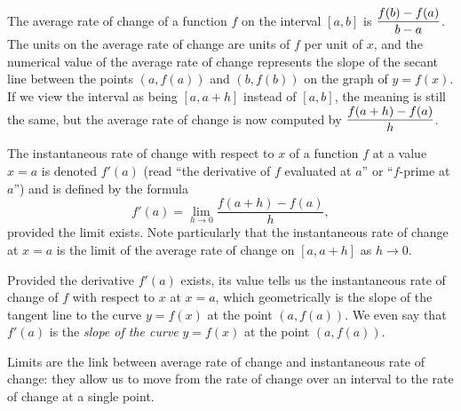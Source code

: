\begin{summary}
\item The average rate of change of a function $f$ on the interval $[a,b]$ is $\displaystyle \frac{f(b)-f(a)}{b-a}$.  The units on the average rate of change are units of $f$ per unit of $x$, and the numerical value of the average rate of change represents the slope of the secant line between the points $(a,f(a))$ and $(b,f(b))$ on the graph of $y = f(x)$.  If we view the interval as being $[a,a+h]$ instead of $[a,b]$, the meaning is still the same, but the average rate of change is now computed by  $\displaystyle \frac{f(a+h)-f(a)}{h}$.
\item The instantaneous rate of change with respect to $x$ of a function $f$ at a value $x = a$ is denoted $f'(a)$ (read ``the derivative of $f$ evaluated at $a$'' or ``$f$-prime at $a$'') and is defined by the formula
$$f'(a) = \lim_{h \to 0} \frac{f(a+h)-f(a)}{h},$$
provided the limit exists.  Note particularly that the instantaneous rate of change at $x = a$ is the limit of the average rate of change on $[a,a+h]$ as $h \to 0$.
\item Provided the derivative $f'(a)$  exists, its value tells us the instantaneous rate of change of $f$ with respect to $x$ at $x = a$, which geometrically is the slope of the tangent line to the curve $y = f(x)$ at the point $(a,f(a))$.  We even say that $f'(a)$ is the \emph{slope of the curve} $y = f(x)$ at the point $(a,f(a))$.
\item Limits are the link between average rate of change and instantaneous rate of change: they allow us to move from the rate of change over an interval to the rate of change at a single point.
\end{summary}

\nin \hrulefill

 

\clearpage
